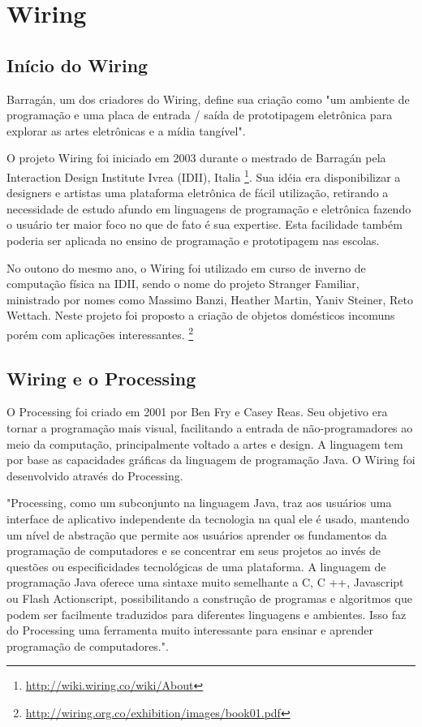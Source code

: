 \chapter[Wiring]{Wiring}

\section{Início do Wiring}
Barragán, um dos criadores do Wiring, define sua criação como "um ambiente de programação e uma placa de entrada / saída de prototipagem eletrônica para explorar as artes eletrônicas e a mídia tangível"\cite{Barragan2004}.

O projeto Wiring foi iniciado em 2003 durante o mestrado de Barragán pela Interaction Design Institute Ivrea (IDII), Italia \footnote{\url{http://wiki.wiring.co/wiki/About}}. Sua idéia era disponibilizar a designers e artistas uma plataforma eletrônica de fácil utilização, retirando a necessidade de estudo afundo em linguagens de programação e eletrônica fazendo o usuário ter maior foco no que de fato é sua expertise. Esta facilidade também poderia ser aplicada no ensino de programação e prototipagem nas escolas.

No outono do mesmo ano, o Wiring foi utilizado em curso de inverno de computação física na IDII, sendo o nome do projeto Stranger Familiar, ministrado por nomes como Massimo Banzi, Heather Martin, Yaniv Steiner, Reto Wettach. Neste projeto foi proposto a criação de objetos domésticos incomuns porém com aplicações interessantes. \footnote{\url{http://wiring.org.co/exhibition/images/book01.pdf}}

\section{Wiring e o Processing}

O Processing foi criado em 2001 por Ben Fry e Casey Reas. Seu objetivo era tornar a programação mais visual, facilitando a entrada de não-programadores ao meio da computação, principalmente voltado a artes e design.\cite{reas2007processing} A linguagem tem por base as capacidades gráficas da linguagem de programação Java. O Wiring foi desenvolvido através do Processing.

"Processing, como um subconjunto na linguagem Java, traz aos usuários uma interface de aplicativo independente da tecnologia na qual ele é usado, mantendo um nível de abstração que permite aos usuários aprender os fundamentos da programação de computadores e se concentrar em seus projetos ao invés de questões ou especificidades tecnológicas de uma plataforma. A linguagem de programação Java oferece uma sintaxe muito semelhante a C, C ++, Javascript ou Flash Actionscript, possibilitando a construção de programas e algoritmos que podem ser facilmente traduzidos para diferentes linguagens e ambientes. Isso faz do Processing uma ferramenta muito interessante para ensinar e aprender programação de computadores."\cite{Barragan2004}.

